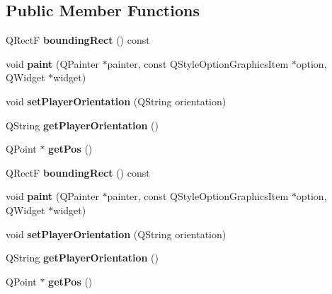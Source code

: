 \subsection*{Public Member Functions}
\begin{DoxyCompactItemize}
\item 
\hypertarget{class_player_a40e85189b099c86221a8ad62f3173980}{}Q\+Rect\+F {\bfseries bounding\+Rect} () const \label{class_player_a40e85189b099c86221a8ad62f3173980}

\item 
\hypertarget{class_player_a02d1d7a8488bc2ed3a9b317dcf17b39c}{}void {\bfseries paint} (Q\+Painter $\ast$painter, const Q\+Style\+Option\+Graphics\+Item $\ast$option, Q\+Widget $\ast$widget)\label{class_player_a02d1d7a8488bc2ed3a9b317dcf17b39c}

\item 
\hypertarget{class_player_a80ee830f8960d206559305a257e34dcb}{}void {\bfseries set\+Player\+Orientation} (Q\+String orientation)\label{class_player_a80ee830f8960d206559305a257e34dcb}

\item 
\hypertarget{class_player_a7c71ec72ae01aa19ffff508fe61df393}{}Q\+String {\bfseries get\+Player\+Orientation} ()\label{class_player_a7c71ec72ae01aa19ffff508fe61df393}

\item 
\hypertarget{class_player_aab3077d4bd36a08a88a618b56a115b1e}{}Q\+Point $\ast$ {\bfseries get\+Pos} ()\label{class_player_aab3077d4bd36a08a88a618b56a115b1e}

\item 
\hypertarget{class_player_a40e85189b099c86221a8ad62f3173980}{}Q\+Rect\+F {\bfseries bounding\+Rect} () const \label{class_player_a40e85189b099c86221a8ad62f3173980}

\item 
\hypertarget{class_player_a02d1d7a8488bc2ed3a9b317dcf17b39c}{}void {\bfseries paint} (Q\+Painter $\ast$painter, const Q\+Style\+Option\+Graphics\+Item $\ast$option, Q\+Widget $\ast$widget)\label{class_player_a02d1d7a8488bc2ed3a9b317dcf17b39c}

\item 
\hypertarget{class_player_a80ee830f8960d206559305a257e34dcb}{}void {\bfseries set\+Player\+Orientation} (Q\+String orientation)\label{class_player_a80ee830f8960d206559305a257e34dcb}

\item 
\hypertarget{class_player_a7c71ec72ae01aa19ffff508fe61df393}{}Q\+String {\bfseries get\+Player\+Orientation} ()\label{class_player_a7c71ec72ae01aa19ffff508fe61df393}

\item 
\hypertarget{class_player_af0118e0d9248cf4e63491228fb4db484}{}Q\+Point $\ast$ {\bfseries get\+Pos} ()\label{class_player_af0118e0d9248cf4e63491228fb4db484}

\end{DoxyCompactItemize}
